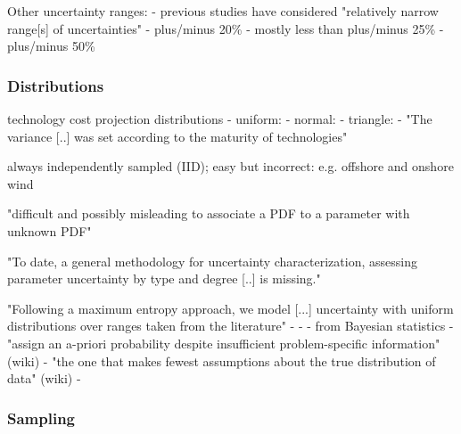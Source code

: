 Other uncertainty ranges:
- previous studies have considered "relatively narrow range[s] of uncertainties" \cite{Li2017}
- plus/minus 20\% \cite{moret_characterization_2017}
- mostly less than plus/minus 25\% \cite{pizarro-alonso_uncertainties_2019}
- plus/minus 50\% \cite{shirizadeh_how_2019}

\subsubsection{Distributions}


technology cost projection distributions
- uniform: \cite{moret_characterization_2017,moret_robust_2016,shirizadeh_how_2019,trondle_trade-offs_2020,pilpola_analyzing_2020,Li2017,Trutnevyte2013,lopion_cost_2019}
- normal: \cite{mavromatidis_uncertainty_2018}
- triangle: \cite{li_using_2020}
- "The variance [..] was set according to the maturity of technologies" \cite{li_using_2020}

always independently sampled (IID); easy but incorrect: e.g. offshore and onshore wind

"difficult and possibly misleading to associate a PDF to a parameter with unknown PDF" \cite{moret_robust_2016}

"To date, a general methodology for uncertainty characterization, assessing parameter uncertainty by type and degree [..] is missing." \cite{moret_robust_2016}


"Following a maximum entropy approach, we model [...] uncertainty with uniform distributions over ranges taken from the literature" \cite{trondle_trade-offs_2020}
- %
- %
- from Bayesian statistics
- "assign an a-priori probability despite insufficient problem-specific information" (wiki)
- "the one that makes fewest assumptions about the true distribution of data" (wiki)
- %

\subsubsection{Sampling}


